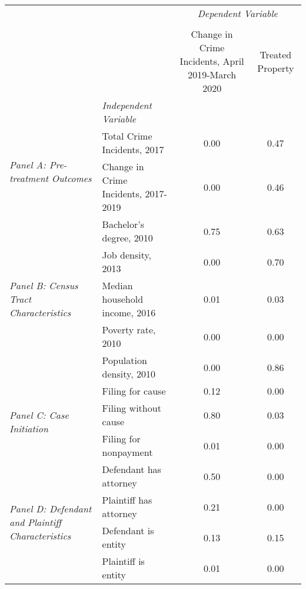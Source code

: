 \begin{tabular}{llcc}
\toprule
 &  & \multicolumn{2}{c}{\textit{Dependent Variable}} \\
\cline{3-4}
\\
 &  & Change in Crime Incidents, April 2019-March 2020 & Treated Property \\
 & \emph{Independent Variable} &  &  \\
\midrule
\multirow[c]{2}{3cm}{\textit{Panel A: Pre-treatment Outcomes}} & Total Crime Incidents, 2017 & 0.00 & 0.47 \\
 & Change in Crime Incidents, 2017-2019 & 0.00 & 0.46 \\
\cline{1-4}
\multirow[c]{5}{3cm}{\textit{Panel B: Census Tract Characteristics}} & Bachelor's degree, 2010 & 0.75 & 0.63 \\
 & Job density, 2013 & 0.00 & 0.70 \\
 & Median household income, 2016 & 0.01 & 0.03 \\
 & Poverty rate, 2010 & 0.00 & 0.00 \\
 & Population density, 2010 & 0.00 & 0.86 \\
\cline{1-4}
\multirow[c]{3}{3cm}{\textit{Panel C: Case Initiation}} & Filing for cause & 0.12 & 0.00 \\
 & Filing without cause & 0.80 & 0.03 \\
 & Filing for nonpayment & 0.01 & 0.00 \\
\cline{1-4}
\multirow[c]{4}{3cm}{\textit{Panel D: Defendant and Plaintiff Characteristics}} & Defendant has attorney & 0.50 & 0.00 \\
 & Plaintiff has attorney & 0.21 & 0.00 \\
 & Defendant is entity & 0.13 & 0.15 \\
 & Plaintiff is entity & 0.01 & 0.00 \\
\cline{1-4}
\bottomrule
\end{tabular}
